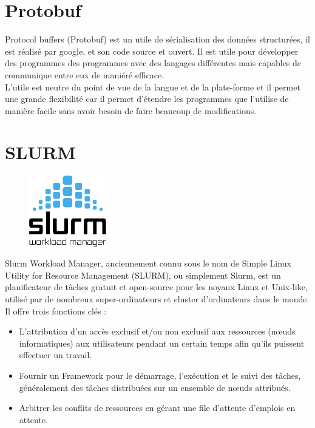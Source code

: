 \section{Protobuf}
Protocol buffers (Protobuf) est un utile de sérialisation des données structurées, il est réalisé par google, et son code source et ouvert. Il est utile pour développer des programmes des programmes avec des langages différentes mais capables de communique entre eux de maniéré efficace.\\
L’utile est neutre du point de vue de la langue et de la plate-forme et il permet une grande flexibilité car il permet d’étendre les programmes que l’utilise de manière facile sans avoir besoin de faire beaucoup de modifications.

\section{SLURM}
\begin{figure}[H]  
 \centering
    \includegraphics[width=0.3\textwidth]{annexe/Figures/slurm_logo.png}
\end{figure}

Slurm Workload Manager, anciennement connu sous le nom de Simple Linux Utility for Resource Management (SLURM), ou simplement Slurm, est un planificateur de tâches gratuit et open-source pour les noyaux Linux et Unix-like, utilisé par de nombreux super-ordinateurs et cluster d'ordinateurs dans le monde.\\
Il offre trois fonctions clés :
\begin{itemize}[label=\textbullet]
\item L'attribution d'un accès exclusif et/ou non exclusif aux ressources (nœuds informatiques) aux utilisateurs pendant un certain temps afin qu'ils puissent effectuer un travail.
\item Fournir un Framework pour le démarrage, l'exécution et le suivi des tâches, généralement des tâches distribuées sur un ensemble de nœuds attribués.
\item Arbitrer les conflits de ressources en gérant une file d'attente d'emplois en attente.
\end{itemize}

